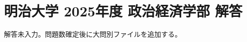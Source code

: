 \documentclass[../../uem_mat_mei_a.tex]{subfiles}
\begin{document}
    \section{明治大学 2025年度 政治経済学部 解答}

    解答未入力。問題数確定後に大問別ファイルを追加する。
\end{document}
